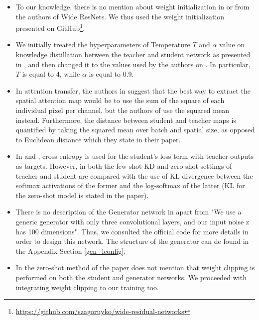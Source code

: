 \begin{itemize}
    \item To our knowledge, there is no mention about weight initialization in \cite{wrn} or \cite{zagoruyko2016paying} from the authors of Wide ResNets. We thus used the weight initialization presented on GitHub\footnote{\url{https://github.com/szagoruyko/wide-residual-networks}}. 
    \item We initially treated the hyperparameters of Temperature $T$ and $\alpha$ value on knowledge distillation between the teacher and student network as presented in \cite{hinton2015distilling}, and then changed it to the values used by the authors on \cite{zagoruyko2016paying}. In particular, $T$ is equal to 4, while $\alpha$ is equal to 0.9.
    \item In attention transfer, the authors in \cite{zagoruyko2016paying} suggest that the best way to extract the spatial attention map would be to use the sum of the square of each individual pixel per channel, but the authors of \cite{Micaelli2019ZeroShotKT} use the squared mean instead. Furthermore, the  distance between student and teacher maps is quantified by taking the squared mean over batch and spatial size, as opposed to Euclidean distance which they state in their paper.
    \item In \cite{zagoruyko2016paying} and \cite{hinton2015distilling}, cross entropy is used for the student's loss term with teacher outputs as targets. However, in both the few-shot KD and zero-shot settings of \cite{Micaelli2019ZeroShotKT} teacher and student are compared with the use of KL divergence between the softmax activations of the former and the log-softmax of the latter (KL for the zero-shot model is stated in the paper). 
    \item There is no description of the Generator network in \cite{Micaelli2019ZeroShotKT} apart from "We use a generic generator with only three convolutional layers, and our input noise z has 100 dimensions". Thus, we consulted the official code for more details in order to design this network. The structure of the generator can de found in the Appendix Section \ref{gen_lconfig}.
    \item In the zero-shot method of \cite{Micaelli2019ZeroShotKT} the paper does not mention that weight clipping is performed on both the student and generator networks. We proceeded with integrating weight clipping to our training too. 
\end{itemize}